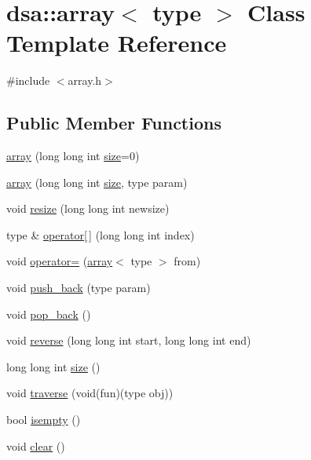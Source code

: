 \hypertarget{classdsa_1_1array}{}\section{dsa\+:\+:array$<$ type $>$ Class Template Reference}
\label{classdsa_1_1array}


{\ttfamily \#include $<$array.\+h$>$}

\subsection*{Public Member Functions}
\begin{DoxyCompactItemize}
\item 
\hyperlink{classdsa_1_1array_a53f3af8220c28e6381d85fb3f30dfeaf}{array} (long long int \hyperlink{classdsa_1_1array_a4fdd4189047c0d953e3d66e91b94c9a7}{size}=0)
\item 
\hyperlink{classdsa_1_1array_a45a2cce51a4d64340cb0deefdf3a8909}{array} (long long int \hyperlink{classdsa_1_1array_a4fdd4189047c0d953e3d66e91b94c9a7}{size}, type param)
\item 
void \hyperlink{classdsa_1_1array_ac07cadd588443d28e57cd1d3702c35cb}{resize} (long long int newsize)
\item 
type \& \hyperlink{classdsa_1_1array_acd9a970794198153c5d69ba4c1fda9ed}{operator\mbox{[}$\,$\mbox{]}} (long long int index)
\item 
void \hyperlink{classdsa_1_1array_a60c9b1dc365c787dfe2ad5622706c9e3}{operator=} (\hyperlink{classdsa_1_1array}{array}$<$ type $>$ from)
\item 
void \hyperlink{classdsa_1_1array_ade3cfef15d5e6fc60d2fd73b19faeee3}{push\+\_\+back} (type param)
\item 
void \hyperlink{classdsa_1_1array_ae59edf3a0e2550ae4bc2e618fff62a73}{pop\+\_\+back} ()
\item 
void \hyperlink{classdsa_1_1array_aa912e367b1600571ca73407b1d306634}{reverse} (long long int start, long long int end)
\item 
long long int \hyperlink{classdsa_1_1array_a4fdd4189047c0d953e3d66e91b94c9a7}{size} ()
\item 
void \hyperlink{classdsa_1_1array_a08303d09488f8f7c480c310f6e76a115}{traverse} (void(fun)(type obj))
\item 
bool \hyperlink{classdsa_1_1array_aba7e465a093cca24c292267ebfa1bb3f}{isempty} ()
\item 
void \hyperlink{classdsa_1_1array_a496818e8b4604a51e06602e25899ab85}{clear} ()
\end{DoxyCompactItemize}


